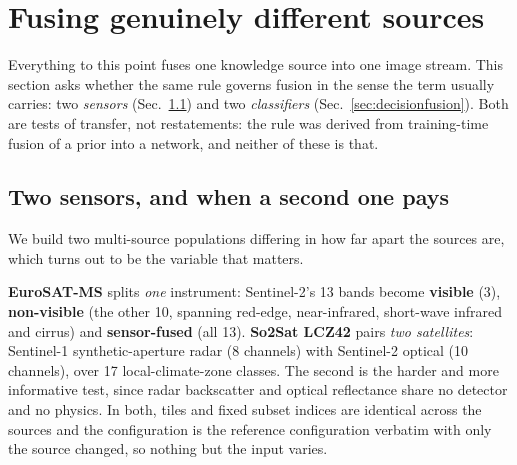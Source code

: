 \section{Fusing genuinely different sources}\label{sec:multisource}

Everything to this point fuses one knowledge source into one image stream. This
section asks whether the same rule governs fusion in the sense the term usually
carries: two \emph{sensors} (Sec.~\ref{sec:multisensor}) and two
\emph{classifiers} (Sec.~\ref{sec:decisionfusion}). Both are tests of
transfer, not restatements: the rule was derived from training-time fusion of a
prior into a network, and neither of these is that.

\subsection{Two sensors, and when a second one pays}\label{sec:multisensor}
We build two multi-source populations differing in how far apart the sources
are, which turns out to be the variable that matters.

\textbf{EuroSAT-MS} splits \emph{one} instrument: Sentinel-2's 13 bands become
\textbf{visible} (3), \textbf{non-visible} (the other 10, spanning red-edge,
near-infrared, short-wave infrared and cirrus) and \textbf{sensor-fused} (all
13). \textbf{So2Sat LCZ42} pairs \emph{two satellites}: Sentinel-1
synthetic-aperture radar (8 channels) with Sentinel-2 optical (10 channels),
over 17 local-climate-zone classes. The second is the harder and more
informative test, since radar backscatter and optical reflectance share no
detector and no physics. In both, tiles and fixed subset indices are identical
across the sources and the configuration is the reference configuration verbatim with only the
source changed, so nothing but the input varies.

